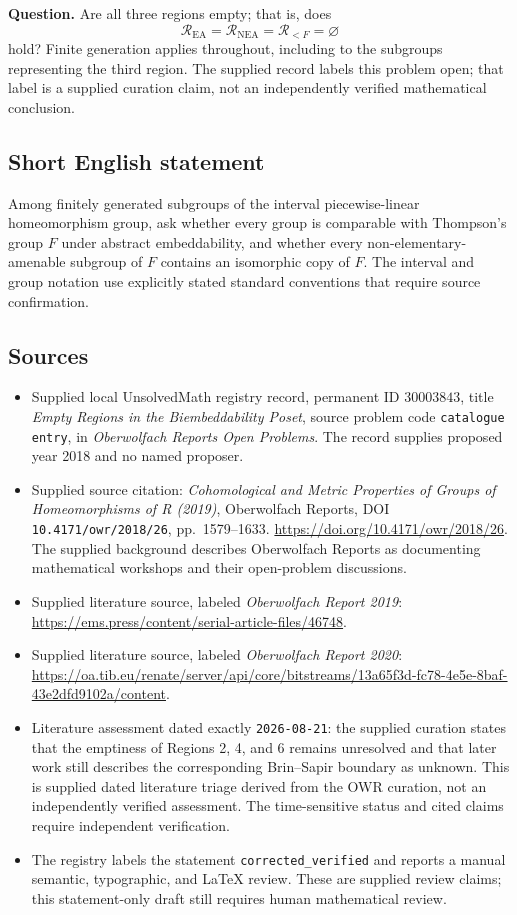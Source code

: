 \documentclass[11pt]{article}
\begin{document}
\textbf{Question.} Are all three regions empty; that is, does
\[
\mathcal R_{\mathrm{EA}}=\mathcal R_{\mathrm{NEA}}=\mathcal R_{<F}=\varnothing
\]
hold? Finite generation applies throughout, including to the subgroups representing the third region. The supplied record labels this problem open; that label is a supplied curation claim, not an independently verified mathematical conclusion.
\subsection{Short English statement}
Among finitely generated subgroups of the interval piecewise-linear homeomorphism group, ask whether every group is comparable with Thompson's group \(F\) under abstract embeddability, and whether every non-elementary-amenable subgroup of \(F\) contains an isomorphic copy of \(F\). The interval and group notation use explicitly stated standard conventions that require source confirmation.
\subsection{Sources}
\begin{itemize}
\item Supplied local UnsolvedMath registry record, permanent ID \(30003843\), title \emph{Empty Regions in the Biembeddability Poset}, source problem code \texttt{catalogue entry}, in \emph{Oberwolfach Reports Open Problems}. The record supplies proposed year 2018 and no named proposer.
\item Supplied source citation: \emph{Cohomological and Metric Properties of Groups of Homeomorphisms of R (2019)}, Oberwolfach Reports, DOI \texttt{10.4171/owr/2018/26}, pp.~1579--1633. \url{https://doi.org/10.4171/owr/2018/26}. The supplied background describes Oberwolfach Reports as documenting mathematical workshops and their open-problem discussions.
\item Supplied literature source, labeled \emph{Oberwolfach Report 2019}: \url{https://ems.press/content/serial-article-files/46748}.
\item Supplied literature source, labeled \emph{Oberwolfach Report 2020}: \url{https://oa.tib.eu/renate/server/api/core/bitstreams/13a65f3d-fc78-4e5e-8baf-43e2dfd9102a/content}.
\item Literature assessment dated exactly \texttt{2026-08-21}: the supplied curation states that the emptiness of Regions 2, 4, and 6 remains unresolved and that later work still describes the corresponding Brin--Sapir boundary as unknown. This is supplied dated literature triage derived from the OWR curation, not an independently verified assessment. The time-sensitive status and cited claims require independent verification.
\item The registry labels the statement \texttt{corrected\_verified} and reports a manual semantic, typographic, and LaTeX review. These are supplied review claims; this statement-only draft still requires human mathematical review.
\end{itemize}
\end{document}
